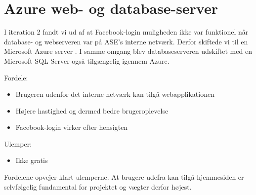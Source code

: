 \section{Azure web- og database-server}

I iteration 2 fandt vi ud af at Facebook-login muligheden ikke var funktionel når database- og webserveren var på ASE's interne netværk. Derfor skiftede vi til en Microsoft Azure server \citep{msazureWeb}. I samme omgang blev databaseserveren udskiftet med en Microsoft SQL Server \citep{sqlserverWeb} også tilgængelig igennem Azure.

Fordele:
\begin{itemize}
	\item Brugeren udenfor det interne netværk kan tilgå webapplikationen
	\item Højere hastighed og dermed bedre brugeroplevelse
	\item Facebook-login virker efter hensigten
\end{itemize}

Ulemper:
\begin{itemize}
	\item Ikke gratis
\end{itemize}

Fordelene opvejer klart ulemperne. At brugere udefra kan tilgå hjemmesiden er selvfølgelig fundamental for projektet og vægter derfor højest.